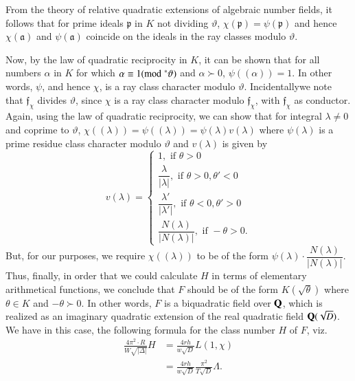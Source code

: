 From the theory of relative quadratic extensions of algebraic number
fields, it follows that for prime ideals $\mathfrak{p}$ in $K$ not
dividing $\vartheta$, $\chi(\mathfrak{p})=\psi(\mathfrak{p})$ and
hence $\chi(\mathfrak{a})$ and $\psi(\mathfrak{a})$ coincide on the
ideals in the ray classes modulo $\vartheta$.

Now, by the law of quadratic reciprocity in $K$, it can be shown that
for all numbers $\alpha$ in $K$ for which $\alpha\equiv
1(\rm{mod} \;^{\ast}\vartheta)$ and $\alpha \succ 0$, $\psi((\alpha))=1$. In other
words, $\psi$, and hence $\chi$, is a ray class character modulo
$\vartheta$. Incidentally\pageoriginale we note that
$\mathfrak{f}_{\chi}$ divides $\vartheta$, since $\chi$ is a ray class
character modulo $\mathfrak{f}_{\chi}$, with $\mathfrak{f}_{\chi}$ as
conductor. Again, using the law of quadratic reciprocity, we can show
that for integral $\lambda\neq 0$ and coprime to $\vartheta$,
$\chi((\lambda))=\psi((\lambda))=\psi(\lambda)v(\lambda)$ where
$\psi(\lambda)$ is a prime residue class character modulo $\vartheta$
and $v(\lambda)$ is given by
$$
v(\lambda)=
\begin{cases}
1, \text{ if }\theta>0\\[7pt]
\dfrac{\lambda}{|\lambda|}, \text{ if }\theta>0,\theta'<0\\[7pt]
\dfrac{\lambda'}{|\lambda'|}, \text{ if }\theta<0,\theta'>0\\[7pt]
\dfrac{N(\lambda)}{|N(\lambda)|},\text{ if } -\theta>0.
\end{cases}
$$
But, for our purposes, we require $\chi((\lambda))$ to be of the form
$\psi(\lambda)\cdot \dfrac{N(\lambda)}{|N(\lambda)|}$. Thus, finally,
in order that we could calculate $H$ in terms of elementary
arithmetical functions, we conclude that $F$ should be of the form
$K(\sqrt{\theta})$ where $\theta\in K$ and $-\theta \succ 0$. In other
words, $F$ is a biquadratic field over $\mathbf{Q}$, which is realized as an
imaginary quadratic extension of the real quadratic field
$\mathbf{Q}(\sqrt{D})$. We have in this case, the following formula for the
class number $H$ of $F$, viz.
\begin{align*}
\frac{4\pi^{2}\cdot R}{W\sqrt{|\Delta|}}H &=
\frac{4rh}{w\sqrt{D}}L(1,\chi)\\
&=
\frac{4rh}{w\sqrt{D}}\frac{\pi^{2}}{T\sqrt{D}}\Lambda.\tag{126}\label{126} 
\end{align*}

